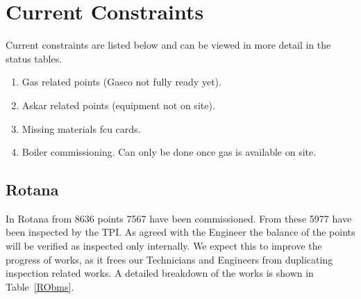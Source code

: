 \section{Current Constraints} 

Current constraints are listed below and can be viewed in more detail
in the status tables.

\begin{enumerate}
\item Gas related points (Gasco not fully ready yet).
\item Askar related points (equipment not on site).
\item Missing materials fcu cards.
\item Boiler commissioning. Can only be done once gas is available on
      site.
\end{enumerate}

\subsection{Rotana}
In Rotana from 8636 points 7567 have been commissioned. From these 5977 have been inspected by the TPI. As agreed with the Engineer the balance of the points will be verified as inspected only internally. We expect this to improve the progress of works, as it frees our Technicians and Engineers from duplicating inspection related works. A detailed breakdown of the works is shown in Table~\ref{RObms}. 
\bigskip



